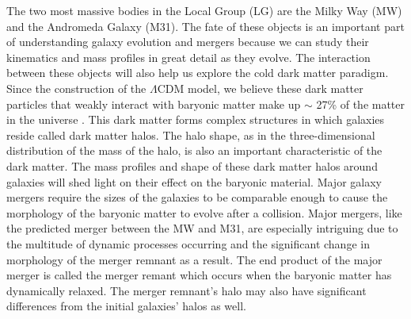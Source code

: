\documentclass[linenumbers, twocolumn]{aastex631}
\begin{document}
The two most massive bodies in the Local Group (LG) are the Milky Way (MW) and the Andromeda Galaxy (M31). The fate of these objects is an important part of understanding galaxy evolution and mergers because we can study their kinematics and mass profiles in great detail as they evolve. 
The interaction between these objects will also help us explore the cold dark matter paradigm. Since the construction of the $\Lambda$CDM model, we believe these dark matter particles that weakly interact with baryonic matter make up $\sim$ 27\% of the matter in the universe \citep{2014LCDM}. This dark matter forms complex structures in which galaxies reside called dark matter halos. 
The halo shape, as in the three-dimensional distribution of the mass of the halo, is also an important characteristic of the dark matter.
The mass profiles and shape of these dark matter halos around galaxies will shed light on their effect on the baryonic material.
Major galaxy mergers require the sizes of the galaxies to be comparable enough to cause the morphology of the baryonic matter to evolve after a collision.
Major mergers, like the predicted merger between the MW and M31, are especially intriguing due to the multitude of dynamic processes occurring and the significant change in morphology of the merger remnant as a result. 
The end product of the major merger is called the merger remant which occurs when the baryonic matter has dynamically relaxed.
The merger remnant's halo may also have significant differences from the initial galaxies' halos as well.
\end{document}

